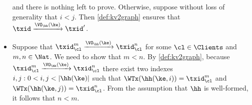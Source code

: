 \begin{itemize}
and there is nothing left to prove. Otherwise, suppose without loss of generality that 
$i < j$. Then \cref{def:kv2graph} ensures that $\txid \xrightarrow{\VO_{\hh}(\ke)} \txid'$. 
\item Suppose that $\txid_{\cl}^{m} \xrightarrow{\VO_{\hh}(\ke)} \txid_{\cl}^{n}$ for 
some $\cl \in \Clients$ and $m, n \in \Nat$. We need to show that $m < n$. 
By \cref{def:kv2graph}, because  $\txid_{\cl}^{m} \xrightarrow{\VO_{\hh}(\ke)} \txid_{\cl}^{n}$ 
there exist two indexes $i,j: 0 < i,j < \lvert \hh(\ke) \rvert$ such that $\WTx(\hh(\ke,i)) = \txid_{\cl}^{m}$ 
and $\WTx(\hh(\ke, j)) = \txid_{\cl}^{n}$. From the assumption that $\hh$ is well-formed, it 
follows that $n < m$.
\end{itemize}